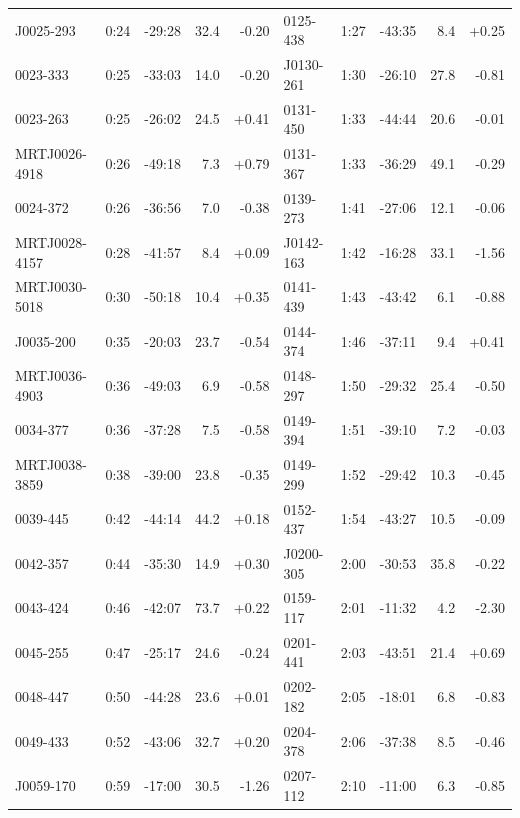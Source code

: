 \documentclass[preprint]{aastex}
\begin{document}
\begin{table}[ht]
\begin{tabular}{l|lrrr||l|lrrr}
 J0025-293 &  0:24 & -29:28 &   32.4 & -0.20 &   0125-438 &  1:27 & -43:35 &    8.4 & +0.25 \\
  0023-333 &  0:25 & -33:03 &   14.0 & -0.20 &  J0130-261 &  1:30 & -26:10 &   27.8 & -0.81 \\
  0023-263 &  0:25 & -26:02 &   24.5 & +0.41 &   0131-450 &  1:33 & -44:44 &   20.6 & -0.01 \\
MRTJ0026-4918 &  0:26 & -49:18 &    7.3 & +0.79 &   0131-367 &  1:33 & -36:29 &   49.1 & -0.29 \\
  0024-372 &  0:26 & -36:56 &    7.0 & -0.38 &   0139-273 &  1:41 & -27:06 &   12.1 & -0.06 \\
MRTJ0028-4157 &  0:28 & -41:57 &    8.4 & +0.09 &  J0142-163 &  1:42 & -16:28 &   33.1 & -1.56 \\
MRTJ0030-5018 &  0:30 & -50:18 &   10.4 & +0.35 &   0141-439 &  1:43 & -43:42 &    6.1 & -0.88 \\
 J0035-200 &  0:35 & -20:03 &   23.7 & -0.54 &   0144-374 &  1:46 & -37:11 &    9.4 & +0.41 \\
MRTJ0036-4903 &  0:36 & -49:03 &    6.9 & -0.58 &   0148-297 &  1:50 & -29:32 &   25.4 & -0.50 \\
  0034-377 &  0:36 & -37:28 &    7.5 & -0.58 &   0149-394 &  1:51 & -39:10 &    7.2 & -0.03 \\
MRTJ0038-3859 &  0:38 & -39:00 &   23.8 & -0.35 &   0149-299 &  1:52 & -29:42 &   10.3 & -0.45 \\
  0039-445 &  0:42 & -44:14 &   44.2 & +0.18 &   0152-437 &  1:54 & -43:27 &   10.5 & -0.09 \\
  0042-357 &  0:44 & -35:30 &   14.9 & +0.30 &  J0200-305 &  2:00 & -30:53 &   35.8 & -0.22 \\
  0043-424 &  0:46 & -42:07 &   73.7 & +0.22 &   0159-117 &  2:01 & -11:32 &    4.2 & -2.30 \\
  0045-255 &  0:47 & -25:17 &   24.6 & -0.24 &   0201-441 &  2:03 & -43:51 &   21.4 & +0.69 \\
  0048-447 &  0:50 & -44:28 &   23.6 & +0.01 &   0202-182 &  2:05 & -18:01 &    6.8 & -0.83 \\
  0049-433 &  0:52 & -43:06 &   32.7 & +0.20 &   0204-378 &  2:06 & -37:38 &    8.5 & -0.46 \\
 J0059-170 &  0:59 & -17:00 &   30.5 & -1.26 &   0207-112 &  2:10 & -11:00 &    6.3 & -0.85 \\
\hline
\end{tabular}
\end{table}
\end{document}
